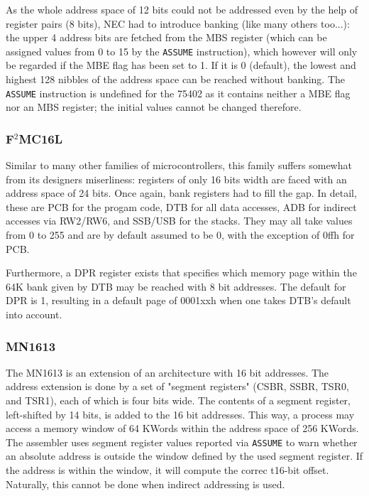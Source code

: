 \documentclass[12pt,twoside]{report}
\newcommand{\tty}[1]{{\tt #1}}
\begin{document}
As the whole address space of 12 bits could not be addressed even by
the help of register pairs (8 bits), NEC had to introduce banking
(like many others too...): the upper 4 address bits are fetched from
the MBS register (which can be assigned values from 0 to 15 by the
\tty{ASSUME} instruction), which however will only be regarded if the MBE
flag has been set to 1.  If it is 0 (default), the lowest and highest
128 nibbles of the address space can be reached without banking.  The
\tty{ASSUME} instruction is undefined for the 75402 as it contains neither
a MBE flag nor an MBS register; the initial values cannot be changed
therefore.


\subsubsection{F$^2$MC16L}

Similar to many other families of microcontrollers, this family suffers
somewhat from its designers miserliness: registers of only 16 bits width
are faced with an address space of 24 bits.  Once again, bank registers
had to fill the gap.  In detail, these are PCB for the progam code, DTB
for all data accesses, ADB for indirect accesses via RW2/RW6, and SSB/USB
for the stacks.  They may all take values from 0 to 255 and are by default
assumed to be 0, with the exception of 0ffh for PCB.

Furthermore, a DPR register exists that specifies which memory page within
the 64K bank given by DTB may be reached with 8 bit addresses.  The
default for DPR is 1, resulting in a default page of 0001xxh when one
takes DTB's default into account.


\subsubsection{MN1613}

The MN1613 is an extension of an architecture with 16 bit addresses.  The
address extension is done by a set of "segment registers" (CSBR, SSBR, TSR0, and
TSR1), each of which is four bits wide.  The contents of a segment register,
left-shifted by 14 bits, is added to the 16 bit addresses.  This way, a process may
access a memory window of 64 KWords within the address space of 256 KWords. The
assembler uses segment register values reported via \tty{ASSUME} to warn whether
an absolute address is outside the window defined by the used segment register.
If the address is within the window, it will compute the correc t16-bit offset.
Naturally, this cannot be done when indirect addressing is used.
\end{document}

